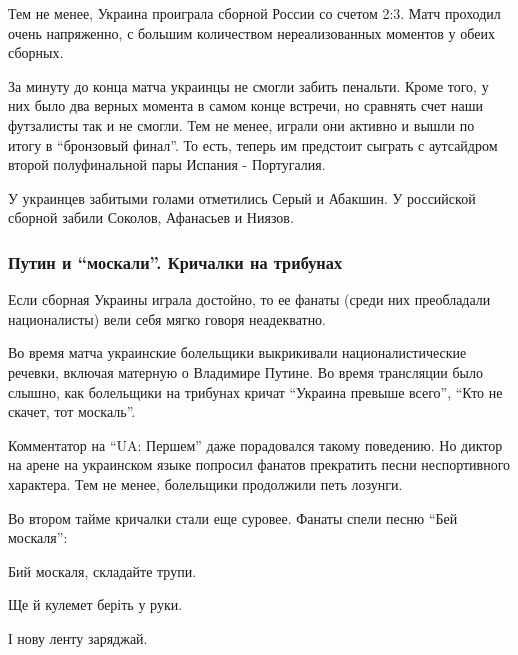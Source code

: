 Тем не менее, Украина проиграла сборной России со счетом 2:3. Матч проходил
очень напряженно, с большим количеством нереализованных моментов у обеих
сборных.

За минуту до конца матча украинцы не смогли забить пенальти. Кроме того, у них
было два верных момента в самом конце встречи, но сравнять счет наши футзалисты
так и не смогли. Тем не менее, играли они активно и вышли по итогу в \enquote{бронзовый
финал}. То есть, теперь им предстоит сыграть с аутсайдром второй полуфинальной
пары Испания - Португалия.

У украинцев забитыми голами отметились Серый и Абакшин. У российской сборной
забили Соколов, Афанасьев и Ниязов.

\subsubsection{Путин и \enquote{москали}. Кричалки на трибунах}

Если сборная Украины играла достойно, то ее фанаты (среди них преобладали
националисты) вели себя мягко говоря неадекватно.

Во время матча украинские болельщики выкрикивали националистические речевки,
включая матерную о Владимире Путине. Во время трансляции было слышно, как
болельщики на трибунах кричат \enquote{Украина превыше всего}, \enquote{Кто не скачет, тот
москаль}.


Комментатор на \enquote{UA: Першем} даже порадовался такому поведению. Но
диктор на арене на украинском языке попросил фанатов прекратить песни
неспортивного характера. Тем не менее, болельщики продолжили петь лозунги.

Во втором тайме кричалки стали еще суровее. Фанаты спели песню \enquote{Бей
москаля}:

Бий москаля, складайте трупи.

Ще й кулемет беріть у руки.

І нову ленту заряджай.
